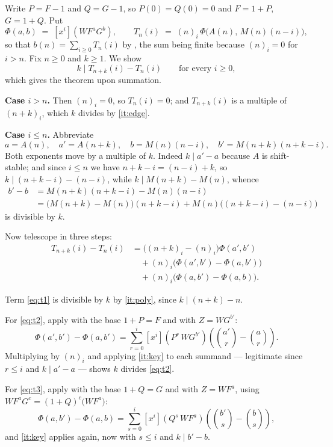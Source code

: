 \documentclass[11pt,a4paper]{article}
\theoremstyle{plain}
\theoremstyle{definition}
\newcommand{\ff}[2]{(#1)_{#2}}
\newcommand{\coeff}[1]{[x^{#1}]}
\begin{document}
Write $P=F-1$ and $Q=G-1$, so $P(0)=Q(0)=0$ and $F=1+P$, $G=1+Q$. Put
\[
  \Phi(a,b)\;=\;\coeff{i}\!\left(W F^{a}G^{b}\right),
  \qquad
  T_n(i)\;=\;\ff{n}{i}\,\Phi\big(A(n),\,M(n)(n-i)\big),
\]
so that $b(n)=\sum_{i\ge0}T_n(i)$ by , the sum being finite because
$\ff{n}{i}=0$ for $i>n$. Fix $n\ge0$ and $k\ge1$. We show
\begin{equation}\label{eq:blockwise}
  k \mid T_{n+k}(i)-T_{n}(i)\qquad\text{for every } i\ge 0,
\end{equation}
which gives the theorem upon summation.

\medskip
\noindent\textbf{Case $i>n$.} Then $\ff{n}{i}=0$, so $T_n(i)=0$; and
$T_{n+k}(i)$ is a multiple of $\ff{n+k}{i}$, which $k$ divides by
\ref{it:edge}.

\medskip
\noindent\textbf{Case $i\le n$.} Abbreviate
\[
  a=A(n),\quad a'=A(n+k),\quad b=M(n)(n-i),\quad b'=M(n+k)(n+k-i).
\]
Both exponents move by a multiple of $k$. Indeed $k\mid a'-a$ because $A$ is
shift-stable; and since $i\le n$ we have $n+k-i=(n-i)+k$, so
$k\mid (n+k-i)-(n-i)$, while $k\mid M(n+k)-M(n)$, whence
\[
\begin{aligned}
  b'-b &= M(n{+}k)(n{+}k{-}i)-M(n)(n{-}i)\\
       &= \big(M(n{+}k)-M(n)\big)(n{+}k{-}i)+M(n)\big((n{+}k{-}i)-(n{-}i)\big)
\end{aligned}
\]
is divisible by $k$.

Now telescope in three steps:
\begin{align}
  T_{n+k}(i)-T_n(i)
  &=\Big(\ff{n+k}{i}-\ff{n}{i}\Big)\Phi(a',b') \label{eq:t1}\\
  &\quad+\ff{n}{i}\Big(\Phi(a',b')-\Phi(a,b')\Big) \label{eq:t2}\\
  &\quad+\ff{n}{i}\Big(\Phi(a,b')-\Phi(a,b)\Big). \label{eq:t3}
\end{align}

Term \eqref{eq:t1} is divisible by $k$ by \ref{it:poly}, since
$k\mid (n+k)-n$.

For \eqref{eq:t2}, apply  with the base $1+P=F$ and with
$Z=W G^{b'}$:
\[
  \Phi(a',b')-\Phi(a,b')
  =\sum_{r=0}^{i}\coeff{i}\!\left(P^{r}\,W G^{b'}\right)
     \left(\binom{a'}{r}-\binom{a}{r}\right).
\]
Multiplying by $\ff{n}{i}$ and applying \ref{it:key} to each summand ---
legitimate since $r\le i$ and $k\mid a'-a$ --- shows $k$ divides \eqref{eq:t2}.

For \eqref{eq:t3}, apply  with the base $1+Q=G$ and with
$Z=W F^{a}$, using $W F^{a}G^{c}=(1+Q)^{c}\big(W F^{a}\big)$:
\[
  \Phi(a,b')-\Phi(a,b)
  =\sum_{s=0}^{i}\coeff{i}\!\left(Q^{s}\,W F^{a}\right)
     \left(\binom{b'}{s}-\binom{b}{s}\right),
\]
and \ref{it:key} applies again, now with $s\le i$ and $k\mid b'-b$.
\end{document}

